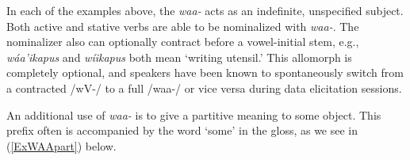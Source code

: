 In each of the examples above, the \textit{waa-} acts as an indefinite, unspecified subject. Both active and stative verbs are able to be nominalized with \textit{waa-}. The nominalizer also can optionally contract before a vowel-initial stem, e.g., \textit{wáa'ikapus} and \textit{wíikapus} both mean `writing utensil.' This allomorph is completely optional, and speakers have been known to spontaneously switch from a contracted /wV-/ to a full /waa-/ or vice versa during data elicitation sessions.


An additional use of \textit{waa-} is to give a partitive meaning to some object. This prefix often is accompanied by the word `some' in the gloss, as we see in (\ref{ExWAApart}) below.

